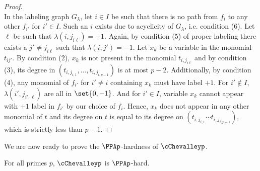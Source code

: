 \begin{proof}
\\
In the labeling graph $G_\lambda$, let $i \in I$ be such that there is no path from $f_i$ to any other $f_{i'}$ for $i' \in I$. Such an $i$ exists due to acyclicity of $G_{\lambda}$, i.e. condition (6). Let $\ell$ be such that $\lambda(i,j_{i\ell}) = +1$. Again, by condition (5) of proper labeling there exists a $j' \neq j_{i\ell}$ such that  $\lambda(i,j') = -1$. Let $x_k$ be a variable in the monomial $t_{ij'}$. By condition (2), $x_k$ is not present in the monomial $t_{i,j_{i\ell}}$ and by condition (3), its degree in $(t_{i,j_{i,1}}, \dots, t_{i,j_{i,p-1}})$ is at most $p-2$. Additionally, by condition (4), any monomial of $f_{i'}$ for $i' \neq i$ containing $x_k$ must have label $+1$. For $i' \notin I$, $\lambda(i',j_{i',\ell})$ are all in $\set{0, -1}$. And for $i' \in I$, variable $x_k$ cannot appear with $+1$ label in $f_{i'}$ by our choice of $f_i$. Hence, $x_k$ does not appear in any other monomial of $t$ and its degree on $t$ is equal to its degree on $(t_{i,j_{i,1}} \cdots t_{i,j_{i,p-1}})$, which is strictly less than $p-1$.

\end{proof}


\medskip
\noindent We are now ready to prove the $\PPAp$-hardness of $\cChevalleyp$.

\begin{lemma} \label{lem:combinedChevalleyPPApHardness}
    For all primes $p$, $\cChevalleyp$ is $\PPAp$-hard.
\end{lemma}

